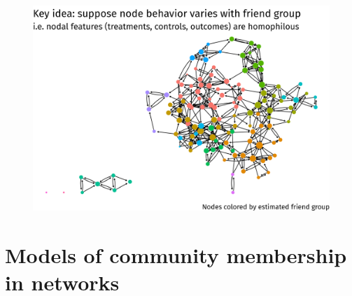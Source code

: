 \documentclass{beamer}
\theoremstyle{remark}
\begin{document}
\begin{frame}
    \centering
    \vspace{3mm}
    \begin{figure}
        \includegraphics[width=\textwidth]{figures/glasgow-friendgroups.png}
    \end{figure}
\end{frame}

\section{Models of community membership in networks}
\end{document}
